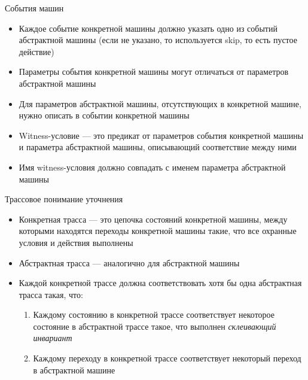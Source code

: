 \documentclass[hyperref={unicode=true}]{beamer}
\begin{document}
    \begin{frame}{События машин}
        \begin{itemize}
            \item Каждое событие конкретной машины должно
                указать одно из событий абстрактной машины
                (если не указано, то используется skip, то есть
                 пустое действие)
            \item Параметры события конкретной машины
                могут отличаться от параметров абстрактной машины
            \item Для параметров абстрактной машины, отсутствующих
                в конкретной машине, нужно описать 
                в событии конкретной машины
            \item Witness-условие --- это предикат от параметров события
                конкретной машины и параметра абстрактной машины,
                описывающий соответствие между ними
            \item Имя witness-условия должно совпадать с именем параметра
                абстрактной машины
        \end{itemize}
    \end{frame}

    \begin{frame}{Трассовое понимание уточнения}
        \begin{itemize}
        \item
        Конкретная трасса --- это цепочка состояний конкретной
        машины, между которыми находятся переходы конкретной
        машины такие, что все охранные условия и действия выполнены
        \item
        Абстрактная трасса --- аналогично для абстрактной машины
        \item
        Каждой конкретной трассе должна соответствовать
        хотя бы одна абстрактная трасса такая, что:
        \begin{enumerate}
        \item
        Каждому состоянию в конкретной трассе соответствует
        некоторое состояние в абстрактной трассе такое,
        что выполнен \emph{склеивающий инвариант}
        \item
        Каждому переходу в конкретной трассе соответствует
        некоторый переход в абстрактной машине
        \end{enumerate}
        \end{itemize}
    \end{frame}
    
\end{document}
